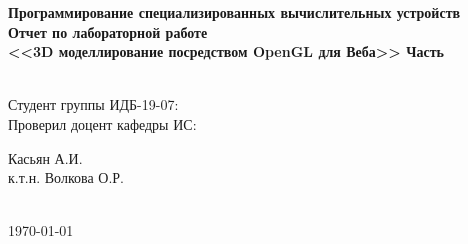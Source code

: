 \documentclass[12pt]{article}
\begin{document}
\begin{titlepage}
\begin{multicols}{2}
    \end{multicols}

    \textbf{\large Программирование специализированных вычислительных устройств}\\
    \textbf{\large Отчет по лабораторной работе}\\[0.5cm]


    { \Large \bfseries <<3D моделлирование посредством OpenGL для Веба>> Часть }\\ %
    \HRline{0.02cm} \\[1.5cm]
    

    \begin{minipage}{\textwidth}
    \begin{multicols}{2}
        \begin{flushleft}
            \large Студент группы ИДБ-19-07:\\
            \large Проверил доцент кафедры ИС:
        \end{flushleft}

        
        \columnbreak
        \begin{flushright}
            \large Касьян А.И.\\
            \large к.т.н. Волкова О.Р.
        \end{flushright}

    \end{multicols}

    \end{minipage}\\[8cm]



    {\large \today}\\[2cm] %


    \end{titlepage}
\end{document}
